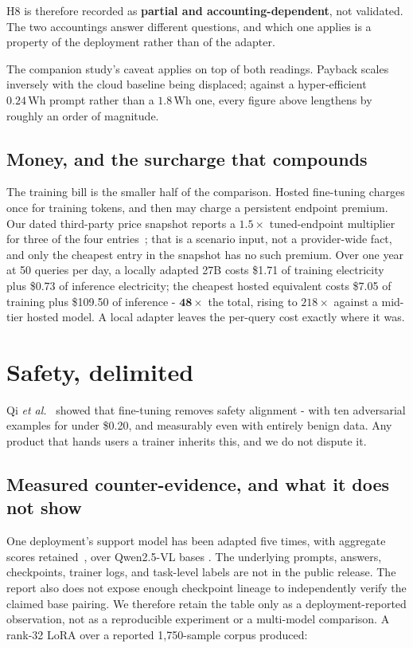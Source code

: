 \documentclass[conference]{IEEEtran}
\newcommand{\Wh}{\,\text{Wh}}
\begin{document}
H8 is therefore recorded as \textbf{partial and accounting-dependent}, not
validated. The two accountings answer different questions, and which one
applies is a property of the deployment rather than of the adapter.

The companion study's caveat applies on top of both readings. Payback scales
inversely with the cloud baseline being displaced; against a hyper-efficient
$0.24\Wh$ prompt rather than a $1.8\Wh$ one, every figure above lengthens by
roughly an order of magnitude.

\subsection{Money, and the surcharge that compounds}

The training bill is the smaller half of the comparison. Hosted fine-tuning
charges once for training tokens, and then may charge a persistent endpoint
premium. Our dated third-party price snapshot reports a $1.5\times$ tuned-endpoint
multiplier for three of the four entries~\cite{tuning_pricing2026}; that is a
scenario input, not a provider-wide fact, and only the cheapest entry in the
snapshot has no such premium. Over one
year at 50 queries per day, a locally adapted 27B costs \$1.71 of training
electricity plus \$0.73 of inference electricity; the cheapest hosted
equivalent costs \$7.05 of training plus \$109.50 of
inference - $\mathbf{48\times}$ the total, rising to $218\times$ against a
mid-tier hosted model. A local adapter leaves the per-query cost exactly where
it was.

\section{Safety, delimited}
\label{sec:safety}

Qi \emph{et al.}~\cite{qi2023finetuning} showed that fine-tuning removes safety
alignment - with ten adversarial examples for under \$0.20, and measurably even
with entirely benign data. Any product that hands users a trainer inherits this,
and we do not dispute it.

\subsection{Measured counter-evidence, and what it does not show}
\label{sec:measured}

One deployment's support model has been adapted five times, with aggregate
scores retained~\cite{autoyou_support2026}, over Qwen2.5-VL bases
\cite{qwen25vl2025}. The underlying prompts, answers, checkpoints, trainer
logs, and task-level labels are not in the public release. The report also does
not expose enough checkpoint lineage to independently verify the claimed base
pairing. We therefore retain the table only as a deployment-reported
observation, not as a reproducible experiment or a multi-model comparison. A
rank-32 LoRA over a reported 1{,}750-sample corpus produced:
\end{document}
